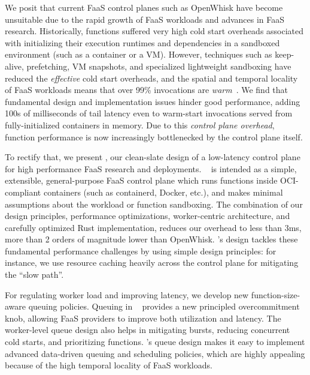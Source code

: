 We posit that current FaaS control planes such as OpenWhisk have become unsuitable due to the rapid growth of FaaS workloads and advances in FaaS research.
Historically, functions suffered very high cold start overheads associated with initializing their execution runtimes and dependencies in a sandboxed environment (such as a container or a VM).
However, techniques such as keep-alive, prefetching, VM snapshots, and specialized lightweight sandboxing have reduced the \emph{effective} cold start overheads, and the spatial and temporal locality of FaaS workloads means that over 99\% invocations are \emph{warm}~\cite{faascache-asplos21}.
We find that fundamental design and implementation issues hinder good performance, adding 100s of milliseconds of tail latency even to warm-start invocations served from fully-initialized containers in memory. 
Due to this \emph{control plane overhead}, function performance is now increasingly bottlenecked by the control plane itself.


To rectify that, we present \sysname, our clean-slate design of a low-latency control plane for high performance FaaS research and deployments.
\sysname~ is intended as a simple, extensible, general-purpose FaaS control plane which runs functions inside OCI-compliant containers (such as containerd, Docker, etc.), and makes minimal assumptions about the workload or function sandboxing.
The combination of our design principles, performance optimizations, worker-centric architecture, and carefully optimized Rust implementation, reduces our overhead to less than 3ms, more than 2 orders of magnitude lower than OpenWhisk. 
\sysname's design tackles these fundamental performance challenges by using simple design principles: for instance, we use resource caching heavily across the control plane for mitigating the ``slow path''. 


For regulating worker load and improving latency, we develop new function-size-aware queuing policies.
Queuing in \sysname~ provides a new principled overcommitment knob, allowing FaaS providers to improve both utilization and latency.
The worker-level queue design also helps in mitigating bursts, reducing concurrent cold starts, and prioritizing functions. 
\sysname's queue design makes it easy to implement advanced data-driven queuing and scheduling policies, which are highly appealing because of the high temporal locality of FaaS workloads. 



